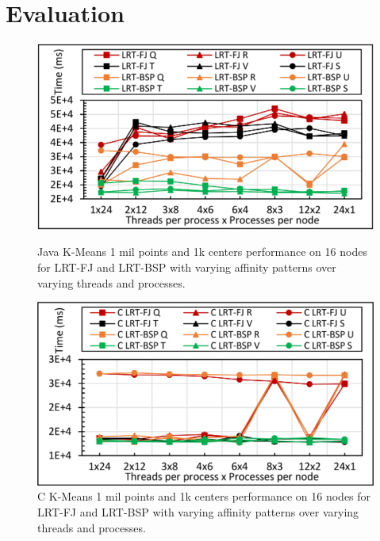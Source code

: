 \documentclass[10pt, conference, compsocconf]{IEEEtran}
\begin{document}
\section{Evaluation} \label{sec:evaluation}

\begin{figure}[!htb]
    \centering
    \begin{minipage}{.49\textwidth}
        \centering        
        \includegraphics[width=1\columnwidth]{images/fig_kmeans_1mil_1k_binding_patterns}
        \caption{Java K-Means 1 mil points and 1k centers performance on 16 nodes for \ac{LRT-FJ} and \ac{LRT-BSP} with varying affinity patterns over varying threads and processes.}
        \label{fig:fig_kmeans_1mil_1k_binding_patterns}
    \end{minipage}
    \hspace{1.4mm}
    \begin{minipage}{0.49\textwidth}
        \centering
        \includegraphics[width=1\columnwidth]{images/fig_C_kmeans_1mil_1k_binding_patterns}
        \caption{C K-Means 1 mil points and 1k centers performance on 16 nodes for \ac{LRT-FJ} and \ac{LRT-BSP} with varying affinity patterns over varying threads and processes.}
        \label{fig:fig_C_kmeans_1mil_1k_binding_patterns}
    \end{minipage}   
\end{figure}
\end{document}
